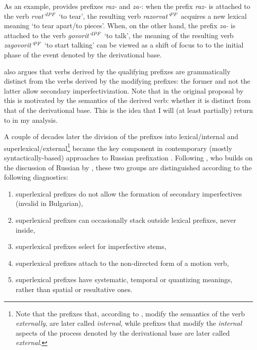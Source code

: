 As an example, \citet{Isachenko:60} provides prefixes \textit{raz-} and \textit{za-}: when the prefix \textit{raz-} is attached to the verb \textit{rvat'}$^{\mathit{IPF}}$ `to tear', the resulting verb \textit{razorvat'}$^{\mathit{PF}}$ acquires a new lexical meaning `to tear apart/to pieces'. When, on the other hand, the prefix \textit{za-} is attached to the verb \textit{govorit'}$^{\mathit{IPF}}$ `to talk', the meaning of the resulting verb \textit{zagovorit'}$^{\mathit{PF}}$ `to start talking' can be viewed as a shift of focus to to the initial phase of the event denoted by the derivational base.

\citet{Isachenko:60} also argues that verbs derived by the qualifying prefixes are grammatically distinct from the verbs derived by the modifying prefixes: the former and not the latter allow secondary imperfectivization. Note that in the original proposal by \citet{Isachenko:60} this is motivated by the semantics of the derived verb: whether it is distinct from that of the derivational base. This is the idea that I will (at least partially) return to in my analysis.

A couple of decades later the division of the prefixes into lexical\slash internal and superlexical\slash external\footnote{Note that the prefixes that, according to \citet{Isachenko:60}, modify the semantics of the verb \textit{externally}, are later called \textit{internal}, while prefixes that modify the \textit{internal} aspects of the process denoted by the derivational base are later called \textit{external}.} became the key component in contemporary (mostly syn\-tac\-tically-based) approaches to Russian prefixation \citep{Schoorlemmer:95, Babko-Malaya:99, Borik:02, Gehrke:04, Ramchand:04, Romanova:04, Romanova:06, Svenonius:04a, Svenonius:04b, DiSciullo:05}. Following \citet[229]{Svenonius:04b}, who builds on the discussion of Russian by \citet{Schoorlemmer:95}, these two groups are distinguished according to the following diagnostics:

\begin{enumerate}
\item superlexical prefixes do not allow the formation of secondary imperfectives (invalid in Bulgarian), 
\item superlexical prefixes can occasionally stack outside lexical prefixes, never inside, 
\item superlexical prefixes select for imperfective stems, 
\item superlexical prefixes attach to the non-directed form of a motion verb,
\item superlexical prefixes have systematic, temporal or quantizing meanings, rather than spatial or resultative ones.
\end{enumerate}

